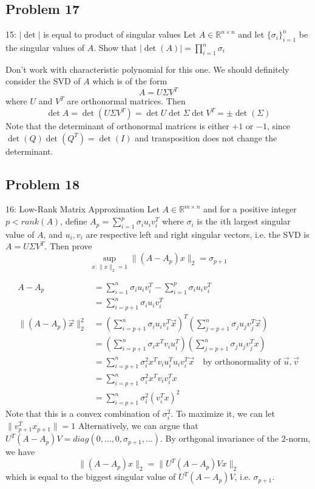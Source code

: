 \documentclass[../main]{subfiles}
\begin{document}
\subsection{Problem 17}

\begin{bbox}{15: $|\det|$ is equal to product of singular values}
    Let $A\in \mathbb R^{n\times n}$ and let $\{\sigma_i\}_{i=1}^n$ be the singular values of $A$. Show that $|\det(A)| = \prod_{i=1}^n \sigma_i$ 
\end{bbox}
\begin{solution}
    Don't work with characteristic polynomial for this one. We should definitely consider the SVD of $A$ which is of the form
    \[
    A = U\Sigma V^T
    \]
    where $U$ and $V^T$ are orthonormal matrices. Then
    \[
    \det A = \det(U\Sigma V^T) = \det U \det \Sigma \det V^T = \pm \det (\Sigma)
    \]
    Note that the determinant of orthonormal matrices is either $+1$ or $-1$, since $\det (Q)\det(Q^T) = \det(I)$ and transposition does not change the determinant.
\end{solution}

\subsection{Problem 18}

\begin{bbox}{16: Low-Rank Matrix Approximation}
    Let $A\in \mathbb R^{m \times n}$ and for a positive integer $p < rank(A)$, define $A_p = \sum_{i=1}^p \sigma_i u_i v_i^T$ where $\sigma_i$ is the $i$th largest singular value of $A$, and $u_i, v_i$ are respective left and right singular vectors, i.e. the SVD is $A = U\Sigma V^T$. Then prove
    \[
    \sup_{x:\|x\|_2 = 1} \|(A-A_p)x\|_2 = \sigma_{p+1}
    \]
\end{bbox}
\begin{solution}
    \begin{align*}
        A-A_p &= \sum_{i=1}^n \sigma_i u_i v_i^T - \sum_{i=1}^p \sigma_i u_iv_i^T\\
        &= \sum_{i=p+1}^n \sigma_iu_iv_i^T\\
        \|(A-A_p)\vec x\|_2^2 &= \left(\sum_{i=p+1}^n \sigma_iu_iv_i^T \vec x \right)^T\left(\sum_{j=p+1}^n \sigma_ju_jv_j^T \vec x\right)\\
        &=\left(\sum_{i=p+1}^n \sigma_i x^Tv_i u_i^T \right) \left(\sum_{j=p+1}^n \sigma_ju_jv_j^Tx\right)\\
        &= \sum_{i=p+1}^n\sigma_i^2 x^T v_i u_i^T u_i v_i^T \vec x \quad \text{by orthonormality of $\vec u, \vec v$}\\
        &= \sum_{i=p+1}^n \sigma_i^2 x^T v_i v_i^T x\\
        &= \sum_{i=p+1}^n \sigma_i^2 (v_i^Tx)^2
    \end{align*} 
    Note that this is a convex combination of $\sigma_i^2$. To maximize it, we can let $\|v_{p+1}^Tx_{p+1}\|=1$
    Alternatively, we can argue that $U^T(A-A_p) V = diag(0,\dots, 0,\sigma_{p+1},\dots)$. By orthgonal invariance of the $2$-norm, we have 
    \[
    \|(A-A_p)x\|_2 = \|U^T(A-A_p)Vx\|_2
    \]
    which is equal to the biggest singular value of $U^T(A-A_p)V$, i.e. $\sigma_{p+1}$. 
\end{solution}
\end{document}
